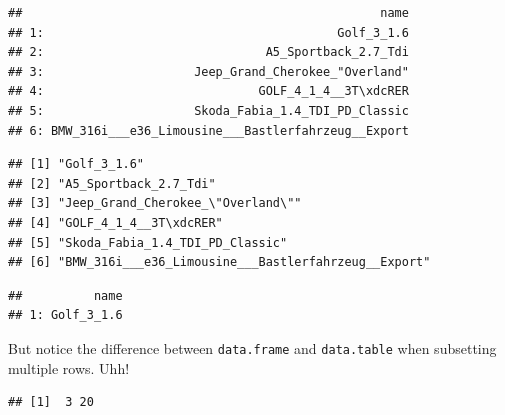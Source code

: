\documentclass[]{book}
\newenvironment{Shaded}{\begin{snugshade}}{\end{snugshade}}
\newcommand{\CommentTok}[1]{\textcolor[rgb]{0.56,0.35,0.01}{\textit{#1}}}
\newcommand{\DecValTok}[1]{\textcolor[rgb]{0.00,0.00,0.81}{#1}}
\newcommand{\NormalTok}[1]{#1}
\newcommand{\OperatorTok}[1]{\textcolor[rgb]{0.81,0.36,0.00}{\textbf{#1}}}
\newcommand{\StringTok}[1]{\textcolor[rgb]{0.31,0.60,0.02}{#1}}
\theoremstyle{definition}
\theoremstyle{definition}
\theoremstyle{definition}
\theoremstyle{remark}
\begin{document}
\begin{verbatim}
##                                                  name
## 1:                                         Golf_3_1.6
## 2:                               A5_Sportback_2.7_Tdi
## 3:                     Jeep_Grand_Cherokee_"Overland"
## 4:                              GOLF_4_1_4__3T\xdcRER
## 5:                     Skoda_Fabia_1.4_TDI_PD_Classic
## 6: BMW_316i___e36_Limousine___Bastlerfahrzeug__Export
\end{verbatim}

\begin{Shaded}
\end{Shaded}

\begin{verbatim}
## [1] "Golf_3_1.6"                                        
## [2] "A5_Sportback_2.7_Tdi"                              
## [3] "Jeep_Grand_Cherokee_\"Overland\""                  
## [4] "GOLF_4_1_4__3T\xdcRER"                             
## [5] "Skoda_Fabia_1.4_TDI_PD_Classic"                    
## [6] "BMW_316i___e36_Limousine___Bastlerfahrzeug__Export"
\end{verbatim}

\begin{Shaded}
\end{Shaded}

\begin{verbatim}
##          name
## 1: Golf_3_1.6
\end{verbatim}

But notice the difference between \texttt{data.frame} and \texttt{data.table} when subsetting multiple rows. Uhh!

\begin{Shaded}
\end{Shaded}

\begin{verbatim}
## [1]  3 20
\end{verbatim}
\end{document}

